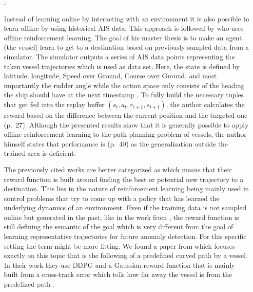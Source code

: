 \cite[pp.~21-26]{s20020426}.
\par 
Instead of learning online by interacting with an environment it is also possible to learn offline by using historical AIS data. This approach is followed by \cite{westerlund2021learning} who uses offline reinforcement learning. The goal of his master thesis is to make an agent (the vessel) learn to get to a destination based on previously sampled data from a simulator. The simulator outputs a series of AIS data points representing the taken vessel trajectories which is used as data set. Here, the state is defined by latitude, longitude, Speed over Ground, Course over Ground, and most importantly the rudder angle while the action space only consists of the heading the ship should have at the next timestamp \cite[pp.~30-33]{westerlund2021learning}. To fully build the necessary tuples that get fed into the replay buffer $(s_t, a_t, r_{t+1}, s_{t+1})$, the author calculates the reward based on the difference between the current position and the targeted one (p.~27). Although the presented results show that it is generally possible to apply offline reinforcement learning to the path planning problem of vessels, the author himself states that performance is (p.~40) as the generalization outside the trained area is deficient.
\par
The previously cited works are better categorized as  which means that their reward function is built around finding the best or potential new trajectory to a destination. This lies in the nature of reinforcement learning being mainly used in control problems that try to come up with a policy that has learned the underlying dynamics of an environment. Even if the training data is not sampled online but generated in the past, like in the work from \cite{westerlund2021learning}, the reward function is still defining the semantic of the goal which is very different from the goal of learning representative trajectories for future anomaly detection. For this specific setting the term  might be more fitting. We found a paper from \cite{martinsen2018curved} which focuses exactly on this topic that is the following of a predefined curved path by a vessel. In their work they use DDPG and a Gaussian reward function that is mainly built from a cross-track error which tells how far away the vessel is from the predefined path \cite[p.~3]{martinsen2018curved}. 